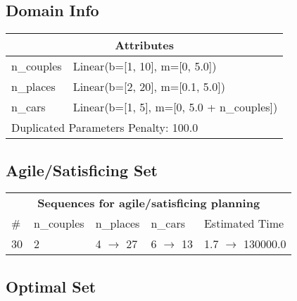 \documentclass{article}
\begin{document}
                    \subsection*{Domain Info}

                    \begin{center}
                    \begin{tabular}{@{}p{}p{}@{}}
                    \multicolumn{2}{c}{\bf \large Attributes}\\\midrule
                    n\_couples & Linear(b=[1, 10], m=[0, 5.0])\\
n\_places & Linear(b=[2, 20], m=[0.1, 5.0])\\
n\_cars & Linear(b=[1, 5], m=[0, 5.0 + n\_couples])
                    
                     \\\midrule
                    \multicolumn{2}{l}{Duplicated Parameters Penalty: 100.0}
                    \end{tabular}
                    \end{center}
                
                         \subsection*{Agile/Satisficing Set}

                        \begin{center}
                        \begin{tabular}{@{}l|l|l|l|l@{}}
                        \multicolumn{5}{c}{\bf \large Sequences for agile/satisficing planning}\\
                        \# & n\_couples & n\_places & n\_cars & Estimated Time\\\midrule
                        30&2&4 $\rightarrow$ 27&6 $\rightarrow$ 13&1.7 $\rightarrow$ 130000.0
                        \end{tabular}
                        \end{center}
                    
                            \subsection*{Optimal Set}
\end{document}
